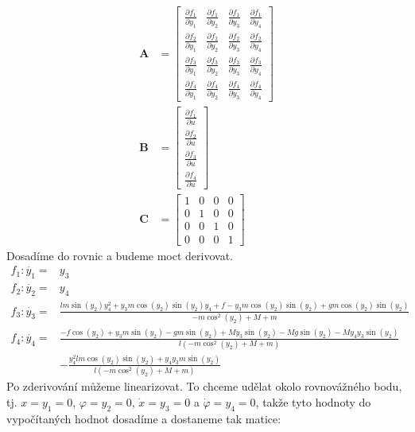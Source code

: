 \documentclass[a4paper, 12pt]{article}
\begin{document}
			\begin{align*}
				\mathbf{A} &= \left[\begin{matrix}
					\frac{\partial f_1}{\partial y_1} & \frac{\partial f_1}{\partial y_2} & \frac{\partial f_1}{\partial y_3} & \frac{\partial f_1}{\partial y_4}\\
					\frac{\partial f_2}{\partial y_1} & \frac{\partial f_2}{\partial y_2} & \frac{\partial f_2}{\partial y_3} & \frac{\partial f_2}{\partial y_4}\\
					\frac{\partial f_3}{\partial y_1} & \frac{\partial f_3}{\partial y_2} & \frac{\partial f_3}{\partial y_3} & \frac{\partial f_3}{\partial y_4}\\
					\frac{\partial f_4}{\partial y_1} & \frac{\partial f_4}{\partial y_2} & \frac{\partial f_4}{\partial y_3} & \frac{\partial f_4}{\partial y_4}	
				\end{matrix}\right]\\
				\mathbf{B} &= \left[\begin{matrix}
					\frac{\partial f_1}{\partial u}\\
					\frac{\partial f_2}{\partial u}\\
					\frac{\partial f_3}{\partial u}\\
					\frac{\partial f_4}{\partial u}
				\end{matrix}\right]\\
				\mathbf{C} &= \left[\begin{matrix}
					1 & 0 & 0 & 0\\
					0 & 1 & 0 & 0\\
					0 & 0 & 1 & 0\\
					0 & 0 & 0 & 1
				\end{matrix}\right]
			\end{align*}
			Dosadíme do rovnic a budeme moct derivovat.
			\begin{align*}
				f_1: \dot{y_1} = &y_3\\
				f_2: \dot{y_2} = &y_4\\
				f_3: \dot{y_3} = &\frac{lm\sin(y_2)y_4^2+y_3m\cos(y_2)\sin(y_2)y_4+f-y_3m\cos(y_2)\sin(y_2)+gm\cos(y_2)\sin(y_2)}{-m\cos^2(y_2)+M+m}\\
				f_4: \dot{y_4} = &\frac{-f\cos(y_2)+y_3m\sin(y_2)-gm\sin(y_2)+My_3\sin(y_2)-Mg\sin(y_2)-My_4y_3\sin(y_2)}{l\left(-m\cos^2(y_2)+M+m\right)}\\
				&- \frac{y_4^2lm\cos(y_2)\sin(y_2)+y_4y_3m\sin(y_2)}{l\left(-m\cos^2(y_2)+M+m\right)}
			\end{align*}
			Po zderivování můžeme linearizovat. To chceme udělat okolo rovnovážného bodu, tj. $x = y_1 = 0$, $\varphi = y_2 = 0$, $\dot{x} = y_3 = 0$ a $\dot{\varphi} = y_4 = 0$, takže tyto hodnoty do vypočítaných hodnot dosadíme a dostaneme tak matice:
\end{document}
